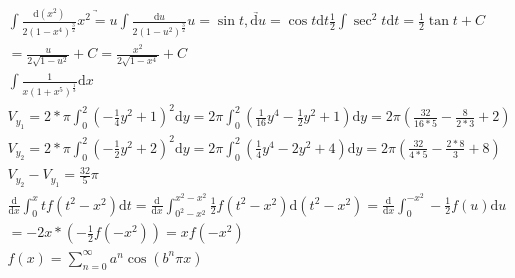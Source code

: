 \documentclass{article}
\begin{document}
\clearpage
\begin{align*}
    \int \frac{\mathrm{d}(x^2)}{2(1-x^4)^{\frac{3}{2}}} \underrightarrow{x^2=u} \int \frac{\mathrm{d}u}{2(1-u^2)^{\frac{3}{2}}} \underrightarrow{u=\sin t,\mathrm{d}u = \cos t\mathrm{d}t} \frac{1}{2} \int \sec^2 t\mathrm{d}t = \frac{1}{2}\tan t + C \\
    = \frac{u}{2\sqrt{1-u^2}} + C = \frac{x^2}{2\sqrt{1-x^4}} + C\\
    \int \frac{1}{x(1+x^5)^{\frac{1}{3}}} \mathrm{d}x \\
    V_{y_{1}} = 2 * \pi\int_{0}^{2} \left(-\frac{1}{4}y^2+1\right)^2\mathrm{d}y = 2\pi\int_{0}^{2}\left(\frac{1}{16}y^4-\frac{1}{2}y^2+1\right)\mathrm{d}y = 2\pi (\frac{32}{16*5}-\frac{8}{2*3}+2) \\ 
    V_{y_{2}} = 2 * \pi\int_{0}^{2} \left(-\frac{1}{2}y^2+2\right)^2\mathrm{d}y = 2\pi\int_{0}^{2}\left(\frac{1}{4}y^4-2y^2+4\right)\mathrm{d}y = 2\pi(\frac{32}{4*5} - \frac{2*8}{3} + 8) \\
    V_{y_{2}}-V_{y_{1}} = \frac{32}{5}\pi \\
    \frac{\mathrm{d}}{\mathrm{d} x} \int_{0}^{x} tf(t^2-x^2) \mathrm{d}t = \frac{\mathrm{d}}{\mathrm{d} x} \int_{0^2-x^2}^{x^2-x^2} \frac{1}{2}f(t^2-x^2) \mathrm{d}(t^2-x^2) = \frac{\mathrm{d}}{\mathrm{d}x} \int_{0}^{-x^2} -\frac{1}{2}f(u)\mathrm{d}u \\ 
    = -2x * \left(-\frac{1}{2}f(-x^2)\right) = xf(-x^2) \\
    f(x) = \sum_{n=0}^{\infty} a^n \cos(b^n \pi x)  \\
\end{align*}
\end{document}
